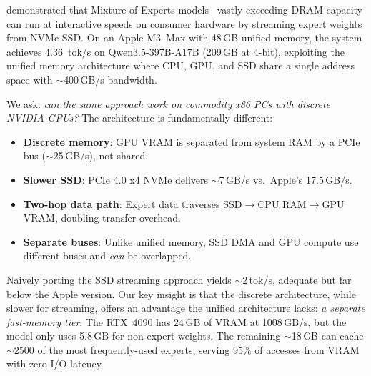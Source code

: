 \documentclass[10pt]{article}
\begin{document}
\citet{flashmoe} demonstrated that Mixture-of-Experts models~\citep{mixtral,deepseekv3} vastly exceeding DRAM capacity can run at interactive speeds on consumer hardware by streaming expert weights from NVMe SSD. On an Apple M3~Max with 48\,GB unified memory, the system achieves 4.36~tok/s on Qwen3.5-397B-A17B (209\,GB at 4-bit), exploiting the unified memory architecture where CPU, GPU, and SSD share a single address space with $\sim$400\,GB/s bandwidth.

We ask: \emph{can the same approach work on commodity x86 PCs with discrete NVIDIA GPUs?} The architecture is fundamentally different:

\begin{itemize}[nosep]
    \item \textbf{Discrete memory}: GPU VRAM is separated from system RAM by a PCIe bus ($\sim$25\,GB/s), not shared.
    \item \textbf{Slower SSD}: PCIe 4.0 x4 NVMe delivers $\sim$7\,GB/s vs.\ Apple's 17.5\,GB/s.
    \item \textbf{Two-hop data path}: Expert data traverses SSD$\to$CPU RAM$\to$GPU VRAM, doubling transfer overhead.
    \item \textbf{Separate buses}: Unlike unified memory, SSD DMA and GPU compute use different buses and \emph{can} be overlapped.
\end{itemize}

Naively porting the SSD streaming approach yields $\sim$2\,tok/s, adequate but far below the Apple version. Our key insight is that the discrete architecture, while slower for streaming, offers an advantage the unified architecture lacks: \emph{a separate fast-memory tier}. The RTX~4090 has 24\,GB of VRAM at 1008\,GB/s, but the model only uses 5.8\,GB for non-expert weights. The remaining $\sim$18\,GB can cache $\sim$2500 of the most frequently-used experts, serving 95\% of accesses from VRAM with zero I/O latency.
\end{document}
